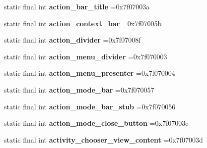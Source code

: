 \begin{DoxyCompactItemize}
\mbox{\label{classproject4_1_1xaria_1_1R_1_1id_af5474b783aa2c32d846d66d083909657}} 
static final int {\bfseries action\+\_\+bar\+\_\+title} =0x7f07003a
\item 
\mbox{\label{classproject4_1_1xaria_1_1R_1_1id_a5a724ded96df0e101a3f03b3ed8106b8}} 
static final int {\bfseries action\+\_\+context\+\_\+bar} =0x7f07005b
\item 
\mbox{\label{classproject4_1_1xaria_1_1R_1_1id_a098227cd9dab122bbdd3a624cbce2ebd}} 
static final int {\bfseries action\+\_\+divider} =0x7f07008f
\item 
\mbox{\label{classproject4_1_1xaria_1_1R_1_1id_a1092a350a694016fac5d318e6bce752d}} 
static final int {\bfseries action\+\_\+menu\+\_\+divider} =0x7f070003
\item 
\mbox{\label{classproject4_1_1xaria_1_1R_1_1id_afccc5df5321e336d4aa4844e85545586}} 
static final int {\bfseries action\+\_\+menu\+\_\+presenter} =0x7f070004
\item 
\mbox{\label{classproject4_1_1xaria_1_1R_1_1id_a84e67b7ef3efee3bc80049a6d207dfa7}} 
static final int {\bfseries action\+\_\+mode\+\_\+bar} =0x7f070057
\item 
\mbox{\label{classproject4_1_1xaria_1_1R_1_1id_a14321ace331400606ba42b351aa5f23d}} 
static final int {\bfseries action\+\_\+mode\+\_\+bar\+\_\+stub} =0x7f070056
\item 
\mbox{\label{classproject4_1_1xaria_1_1R_1_1id_ab4c41ceb1ab5bc818cf64a03031a5972}} 
static final int {\bfseries action\+\_\+mode\+\_\+close\+\_\+button} =0x7f07003c
\item 
\mbox{\label{classproject4_1_1xaria_1_1R_1_1id_a1fda3f5f9c0bf17935d61ef4088915a9}} 
static final int {\bfseries activity\+\_\+chooser\+\_\+view\+\_\+content} =0x7f07003d
\item 
\mbox{\label{classproject4_1_1xaria_1_1R_1_1id_aac3b5038508c4226371905c936b2d8ec}} 

\end{DoxyCompactItemize}
